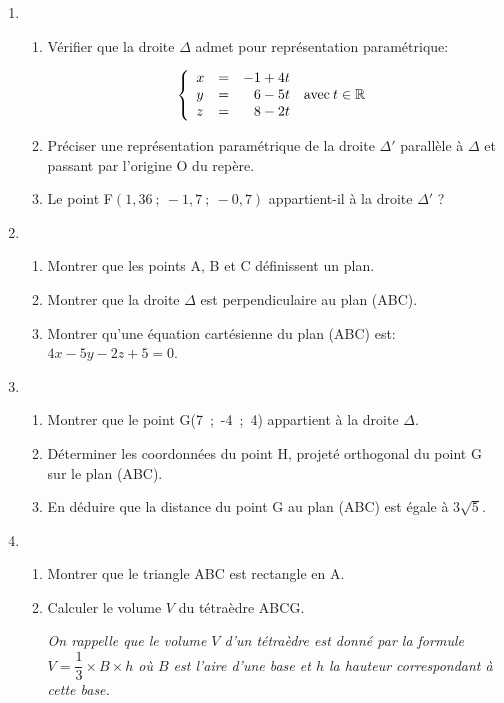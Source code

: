 \documentclass[10pt,a4paper]{article}
\newcommand{\R}{\mathbb{R}}
\begin{document}
\begin{enumerate}
\item 
	\begin{enumerate}
		\item Vérifier que la droite $\Delta$ admet pour représentation paramétrique:
		
\[\left\{\begin{array}{l c l}
x &=& -1 + 4t\\
y &=& \phantom{-}6 - 5t \quad\text{avec}\: t \in \R\\
z &=& \phantom{-}8 - 2t
\end{array}\right.\]

		\item Préciser une représentation paramétrique de la droite $\Delta'$ parallèle à $\Delta$ et passant par l'origine O du repère.
		\item Le point F$(1,36~;~-1,7~;~-0,7)$ appartient-il à la droite $\Delta'$ ?
	\end{enumerate}	
\item
	\begin{enumerate}
		\item Montrer que les points A, B et C définissent un plan.
		\item Montrer que la droite $\Delta$ est perpendiculaire au plan (ABC).
		\item Montrer qu'une équation cartésienne du plan (ABC) est: $4x - 5y - 2z + 5 = 0$.
	\end{enumerate}
\item
	\begin{enumerate}
		\item Montrer que le point G(7~;~-4~;~4) appartient à la droite $\Delta$.
		\item Déterminer les coordonnées du point H, projeté orthogonal du point G sur le plan (ABC).
		\item En déduire que la distance du point G au plan (ABC) est égale à $3\sqrt 5$.
	\end{enumerate}
\item
	\begin{enumerate}
		\item Montrer que le triangle ABC est rectangle en A.
		\item Calculer le volume $V$ du tétraèdre ABCG.
		
\emph{On rappelle que le volume $V$ d'un tétraèdre est donné par la formule $V = \dfrac13 \times  B \times h$ où $B$ est l'aire d'une base et $h$ la hauteur correspondant à cette base.}
	\end{enumerate}
\end{enumerate}
\end{document}
